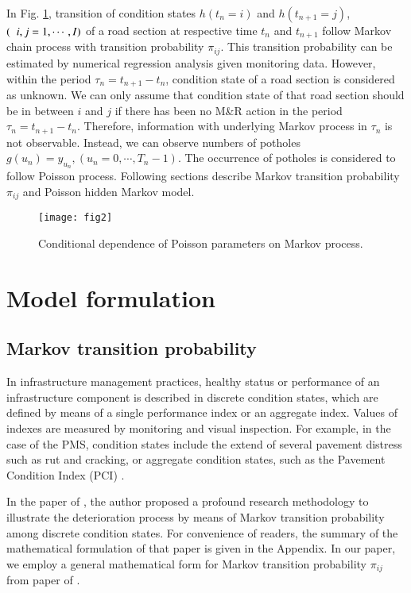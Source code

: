 \documentclass[a4paper,oneside,onecolumn,preprint,10pt,authoryear]{elsarticle}
\begin{document}
In Fig. \ref{fig2}, transition of condition states $h(t_n=i)$ and $h(t_{n+1}=j)$, $(\hspace{2mm}i,j=1,\cdots, I)$ of a road section at respective time $t_n$ and $t_{n+1}$ follow Markov chain process with transition probability $\pi_{ij}$. This transition probability can be estimated by numerical regression analysis given monitoring data. However, within the period $\tau_n=t_{n+1}-t_n$, condition state of a road section is considered as unknown. We can only assume that condition state of that road section should be in between $i$ and $j$ if there has been no M\&R action in the period $\tau_n=t_{n+1}-t_n$. Therefore, information with underlying Markov process in $\tau_n$ is not observable. Instead, we can observe numbers of potholes $g(u_n)=y_{u_n}, (u_n=0, \cdots, T_n-1)$. The occurrence of potholes is considered to follow Poisson process. Following sections describe Markov transition probability $\pi_{ij}$ and Poisson hidden Markov model.
\begin{figure}
\begin{center}
\begin{footnotesize}
\texttt{[image: fig2]}\\
\end{footnotesize}
\end{center}
\caption{Conditional dependence of Poisson parameters on Markov process.}
\label{fig2}
\end{figure}

\section{Model formulation}
\label{sec4}
\subsection{Markov transition probability}
\label{sec41}
In infrastructure management practices, healthy status or performance of an infrastructure component is described in discrete condition states, which are defined by means of a single performance index or an aggregate index. Values of indexes are measured by monitoring and visual inspection. For example, in the case of the PMS, condition states include the extend of several pavement distress such as rut and cracking, or aggregate condition states, such as the Pavement Condition Index (PCI) \citep{shahin05}.

In the paper of \citet{kobayashitsuda}, the author proposed a profound research methodology to illustrate the deterioration process by means of Markov transition probability among discrete condition states. For convenience of readers, the summary of the mathematical formulation of that paper is given in the Appendix. In our paper, we employ a general mathematical form for Markov transition probability $\pi_{ij}$ from paper of \citet{kobayashitsuda}. 
\end{document}
